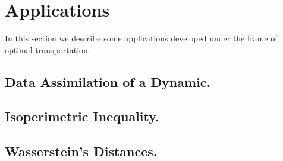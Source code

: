 \chapter{Applications}
In this section we describe some applications developed under the frame of optimal transportation.
\section{Data Assimilation of a Dynamic.}
\section{Isoperimetric Inequality.}
\section{Wasserstein's Distances.}
